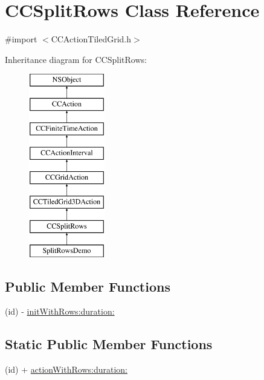 \hypertarget{interface_c_c_split_rows}{\section{C\-C\-Split\-Rows Class Reference}
\label{interface_c_c_split_rows}
}


{\ttfamily \#import $<$C\-C\-Action\-Tiled\-Grid.\-h$>$}

Inheritance diagram for C\-C\-Split\-Rows\-:\begin{figure}[H]
\begin{center}
\leavevmode
\includegraphics[height=8.000000cm]{interface_c_c_split_rows}
\end{center}
\end{figure}
\subsection*{Public Member Functions}
\begin{DoxyCompactItemize}
\item 
(id) -\/ \hyperlink{interface_c_c_split_rows_aaed984c961f3742446b9b4db0d460a79}{init\-With\-Rows\-:duration\-:}
\end{DoxyCompactItemize}
\subsection*{Static Public Member Functions}
\begin{DoxyCompactItemize}
\item 
(id) + \hyperlink{interface_c_c_split_rows_a4b2be0cfb7884336eead475ff49171db}{action\-With\-Rows\-:duration\-:}
\end{DoxyCompactItemize}
